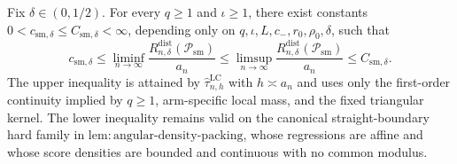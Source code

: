 Fix \(\delta\in(0,1/2)\). For every \(q\geq1\) and \(\iota\geq1\), there exist constants \(0<c_{\mathrm{sm},\delta}\leq C_{\mathrm{sm},\delta}<\infty\), depending only on \(q,\iota,L,c_{-},r_0,\rho_0,\delta\), such that
\[
c_{\mathrm{sm},\delta}\leq\liminf_{n\to\infty}\frac{R_{n,\delta}^{\mathrm{dist}}(\mathcal{P}_{\mathrm{sm}})}{a_n}\leq\limsup_{n\to\infty}\frac{R_{n,\delta}^{\mathrm{dist}}(\mathcal{P}_{\mathrm{sm}})}{a_n}\leq C_{\mathrm{sm},\delta}.
\]
The upper inequality is attained by \(\widehat{\tau}^{\mathrm{LC}}_{n,h}\) with \(h\asymp a_n\) and uses only the first-order continuity implied by \(q\geq1\), arm-specific local mass, and the fixed triangular kernel. The lower inequality remains valid on the canonical straight-boundary hard family in \(\mathrm{lem:angular\text{-}density\text{-}packing}\), whose regressions are affine and whose score densities are bounded and continuous with no common modulus.
